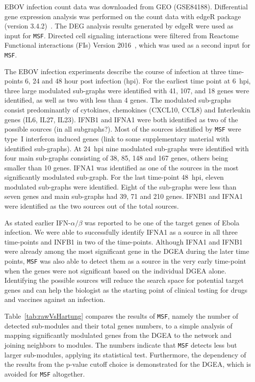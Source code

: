 \documentclass[10pt,a4paper,twocolumn]{article}
\newcommand{\ILH}[1]{\begingroup\color{blue}#1\endgroup}
\newcommand{\TODO}[1]{\begingroup\color{red}#1\endgroup}
\begin{document}
EBOV infection count data was downloaded from GEO (GSE84188). Differential
gene expression analysis was performed on the count data with edgeR package
(version 3.4.2)~\cite{edgeR}. The DEG analysis results generated by edgeR
were used as input for \texttt{MSF}. Directed cell signaling interactions
were filtered from Reactome Functional interactions (FIs) Version
2016~\cite{Cytokegg}, which was used as a second input for \texttt{MSF}.

The EBOV infection experiments describe the course of infection at three
time-points 6, 24 and 48 hour post infection (hpi). For the earliest time
point at 6~hpi, three large modulated sub-graphs were identified with 41,
107, and 18 genes were identified, as well as two with less than 4 genes.
The modulated sub-graphs consist predominantly of cytokines, chemokines
(CXCL10, CCL8) and Interleukin genes (IL6, IL27, IL23).
IFNB1 and IFNA1 were both identified as two of the possible sources
\ILH{(in all subgraphs?)}.
Most of the sources identified by \texttt{MSF} were
type~I interferon induced genes \ILH{(link to some supplementary
  material with identified sub-graphs)}.
At 24~hpi nine modulated sub-graphs were
identified with four main sub-graphs consisting
of 38, 85, 148 and 167 genes, others being smaller than 10 genes. IFNA1 was identified as one of the sources in
the most significantly modulated sub-graph. For the last time-point 48~hpi,
eleven modulated sub-graphs were identified. Eight of the sub-graphs were
less than seven genes and main sub-graphs had 39, 71 and 210 genes. IFNB1
and IFNA1 were identified as \TODO{the two sources out of the total sources}.

As stated earlier IFN-$\alpha / \beta$ was reported to be one of the target
genes of Ebola infection. We were able to successfully identify IFNA1 as a
source in all three time-points and INFB1 in two of the
time-points. Although IFNA1 and IFNB1 were already among the most
significant gene in the DGEA during the later time points, \texttt{MSF} was
also able to detect them as a source in the very early time-point when the
genes were not significant based on the individual DGEA alone. Identifying
the possible sources will reduce the search space for potential target
genes and can help the biologist as the starting point of clinical testing
for drugs and vaccines against an infection.

Table~\ref{tab:rawVsHartung} compares the results of \texttt{MSF}, namely
the number of detected sub-modules and their total genes numbers, to a
simple analysis of mapping significantly modulated genes from the DGEA to
the network and joining neighbors to modules. The numbers indicate that
\texttt{MSF} detects less but larger sub-modules, applying its statistical
test.  Furthermore, the dependency of the results from the p-value cutoff
choice is demonstrated for the DGEA, which is avoided for \texttt{MSF}
altogether.
\end{document}
